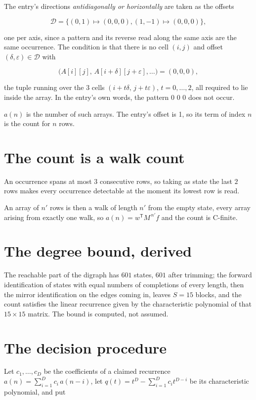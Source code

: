 \documentclass[11pt]{article}
\theoremstyle{definition}
\begin{document}
The entry's directions {\itshape antidiagonally or horizontally} are taken as the offsets

\[\mathcal{D} = \{(0,1)\mapsto(0,0,0), (1,-1)\mapsto(0,0,0)\},\]

one per axis, since a pattern and its reverse read along the same axis are the same occurrence. The condition is that there is no cell $(i,j)$ and offset $(\delta,\varepsilon)\in\mathcal{D}$ with

\[\bigl(A[i][j],\,A[i{+}\delta][j{+}\varepsilon],\dots\bigr) = (0, 0, 0),\]

the tuple running over the $3$ cells $(i+t\delta,\,j+t\varepsilon)$, $t = 0,\dots,2$, all required to lie inside the array. In the entry's own words, the pattern 0 0 0 does not occur.

$a(n)$ is the number of such arrays. The entry's offset is 1, so its term of index $n$ is the count for $n$ rows.

\section{The count is a walk count}

An occurrence spans at most $3$ consecutive rows, so taking as state the last $2$ rows makes every occurrence detectable at the moment its lowest row is read.

An array of $n'$ rows is then a walk of length $n'$ from the empty state, every array arising from exactly one walk, so $a(n) = w^{\mathsf T}M^{\,n'}f$ and the count is C-finite.

\section{The degree bound, derived}

The reachable part of the digraph has $601$ states, $601$ after trimming; the forward identification of states with equal numbers of completions of every length, then the mirror identification on the edges coming in, leaves $S = 15$ blocks, and the count satisfies the linear recurrence given by the characteristic polynomial of that $15\times15$ matrix. The bound is computed, not assumed.

\section{The decision procedure}

Let $c_1,\dots,c_D$ be the coefficients of a claimed recurrence $a(n) = \sum_{i=1}^{D} c_i\,a(n-i)$, let $q(t) = t^{D} - \sum_{i=1}^{D} c_i t^{D-i}$ be its characteristic polynomial, and put
\end{document}
